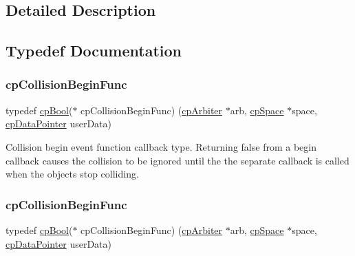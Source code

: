 \subsection{Detailed Description}


\subsection{Typedef Documentation}
\mbox{\label{group__cpSpace_ga3134f145bfc7ca4ef69b350978c26a5a}} 
\subsubsection{\texorpdfstring{cp\+Collision\+Begin\+Func}{cpCollisionBeginFunc}\hspace{0.1cm}{\footnotesize\ttfamily [1/2]}}
{\footnotesize\ttfamily typedef \hyperlink{group__basicTypes_gabc5e752c48f3449ca26ef413ecbd647e}{cp\+Bool}($\ast$ cp\+Collision\+Begin\+Func) (\hyperlink{structcpArbiter}{cp\+Arbiter} $\ast$arb, \hyperlink{structcpSpace}{cp\+Space} $\ast$space, \hyperlink{group__basicTypes_ga2ac2c3c31e21893941f9e4f8ee279447}{cp\+Data\+Pointer} user\+Data)}

Collision begin event function callback type. Returning false from a begin callback causes the collision to be ignored until the the separate callback is called when the objects stop colliding. \mbox{\label{group__cpSpace_ga3134f145bfc7ca4ef69b350978c26a5a}} 
\subsubsection{\texorpdfstring{cp\+Collision\+Begin\+Func}{cpCollisionBeginFunc}\hspace{0.1cm}{\footnotesize\ttfamily [2/2]}}
{\footnotesize\ttfamily typedef \hyperlink{group__basicTypes_gabc5e752c48f3449ca26ef413ecbd647e}{cp\+Bool}($\ast$ cp\+Collision\+Begin\+Func) (\hyperlink{structcpArbiter}{cp\+Arbiter} $\ast$arb, \hyperlink{structcpSpace}{cp\+Space} $\ast$space, \hyperlink{group__basicTypes_ga2ac2c3c31e21893941f9e4f8ee279447}{cp\+Data\+Pointer} user\+Data)}

